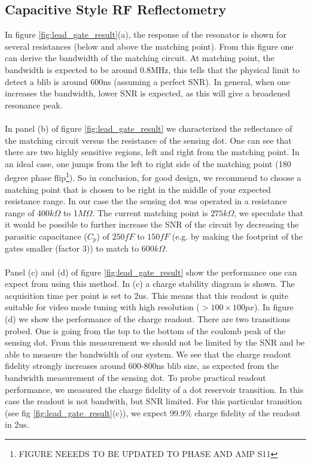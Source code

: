 \documentclass{article}
\begin{document}

\subsection{Capacitive Style RF Reflectometry} %
\label{sub:capacitive_style_rf_reflectometry}
In figure \ref{fig:lead_gate_result}(a), the response of the resonator is shown for several resistances (below and above the matching point). From this figure one can derive the bandwidth of the matching circuit. At matching point, the bandwidth is expected to be around 0.8MHz, this tells that the physical limit to detect a blib is around 600ns (assuming a perfect SNR). In general, when one increases the bandwidth, lower SNR is expected, as this will give a broadened resonance peak.
\\ \\
In panel (b) of figure \ref{fig:lead_gate_result} we characterized the reflectance of the matching circuit versus the resistance of the sensing dot. One can see that there are two highly sensitive regions, left and right from the matching point. In an ideal case, one jumps from the left to right side of the matching point (180 degree phase flip\footnote{FIGURE NEEEDS TO BE UPDATED TO PHASE AND AMP S11}). So in conclusion, for good design, we recommend to choose a matching point that is chosen to be right in the middle of your expected resistance range. In our case the the sensing dot was operated in a resistance range of 400$k\Omega$ to 1$M\Omega$. The current matching point is $275k\Omega$, we speculate that it would be possible to further increase the SNR of the circuit by decreasing the parasitic capacitance ($C_p$) of $250fF$ to $150fF$ (e.g. by making the footprint of the gates smaller (factor 3)) to match to $600k\Omega$.
\\ \\
Panel (c) and (d) of figure \ref{fig:lead_gate_result} show the performance one can expect from using this method. In (c) a charge stability diagram is shown. The acquisition time per point is set to 2us. This means that this readout is quite suitable for video mode tuning with high resolution ($>100\times100px$). In figure (d) we show the performance of the charge readout. There are two transitions probed. One is going from the top to the bottom of the coulomb peak of the sensing dot. From this measurement we should not be limited by the SNR and be able to measure the bandwidth of our system. We see that the charge readout fidelity strongly increases around 600-800ns blib size, as expected from the bandwidth measurement of the sensing dot. To probe practical readout performance, we measured the charge fidelity of a dot reservoir transition. In this case the readout is not bandwith, but SNR limited. For this particular transition (see fig \ref{fig:lead_gate_result}(c)), we expect 99.9\% charge fidelity of the readout in 2us.
\end{document}
